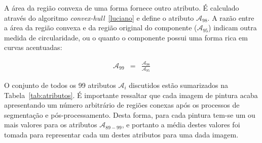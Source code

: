 A área da região convexa de uma forma fornece outro atributo. É calculado
através do algoritmo \textit{convex-hull}~\ref{luciano} e define o atributo
$\mathcal{A}_{98}$. A razão entre a área da região convexa e da região original
do componente ($\mathcal{A}_{95}$) indicam outra medida de circularidade, ou o
quanto o componente possui uma forma rica em curvas acentuadas:

\begin{eqnarray}
  \mathcal{A}_{99} & = & \frac{\mathcal{A}_{98}}{\mathcal{A}_{95}}
\end{eqnarray}

O conjunto de todos os 99 atributos $\mathcal{A}_i$ discutidos estão sumarizados na
Tabela~\ref{tab:atributos}. É importante ressaltar que cada imagem de pintura
acaba apresentando um número arbitrário de regiões conexas após os processos de
segmentação e pós-processamento. Desta forma, para cada pintura tem-se um ou
mais valores para os atributos $\mathcal{A}_{89-99}$, e portanto a média destes
valores foi tomada para representar cada um destes atributos para uma dada imagem.

